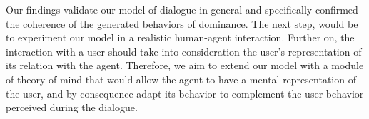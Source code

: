 \documentclass{llncs}
\begin{document}
	Our findings validate our model of dialogue in general and specifically confirmed the coherence of the generated behaviors of dominance. 
	The next step, would be to experiment our model in a realistic human-agent interaction.
	Further on, the interaction with a user should take into consideration the user's representation of its relation with the agent. Therefore, we aim to extend our model with a module of theory of mind that would allow the agent to have a mental representation of the user, and by consequence adapt its behavior to complement the user behavior perceived during the dialogue.
	
	
		

	
	\vskip 4pt
	
	\small{}



	
\end{document}
